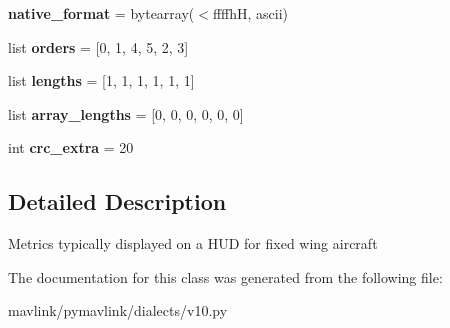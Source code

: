 \begin{DoxyCompactItemize}
{\bfseries native\+\_\+format} = bytearray(\textquotesingle{}$<$ffffhH\textquotesingle{}, \textquotesingle{}ascii\textquotesingle{})
\item 
\mbox{\label{classpymavlink_1_1dialects_1_1v10_1_1MAVLink__vfr__hud__message_a63f863fcd82536a0530cb5beb4d84299}} 
list {\bfseries orders} = \mbox{[}0, 1, 4, 5, 2, 3\mbox{]}
\item 
\mbox{\label{classpymavlink_1_1dialects_1_1v10_1_1MAVLink__vfr__hud__message_a2b2ec9c51dfeb7dee008fb314666ee49}} 
list {\bfseries lengths} = \mbox{[}1, 1, 1, 1, 1, 1\mbox{]}
\item 
\mbox{\label{classpymavlink_1_1dialects_1_1v10_1_1MAVLink__vfr__hud__message_af063adc9d2056ebdc9c5f714ece38a4e}} 
list {\bfseries array\+\_\+lengths} = \mbox{[}0, 0, 0, 0, 0, 0\mbox{]}
\item 
\mbox{\label{classpymavlink_1_1dialects_1_1v10_1_1MAVLink__vfr__hud__message_ada0bd180a7f1ea8c6e142ab3635a3f35}} 
int {\bfseries crc\+\_\+extra} = 20
\end{DoxyCompactItemize}


\subsection{Detailed Description}
\begin{DoxyVerb}Metrics typically displayed on a HUD for fixed wing aircraft
\end{DoxyVerb}
 

The documentation for this class was generated from the following file\+:\begin{DoxyCompactItemize}
\item 
mavlink/pymavlink/dialects/v10.\+py\end{DoxyCompactItemize}

